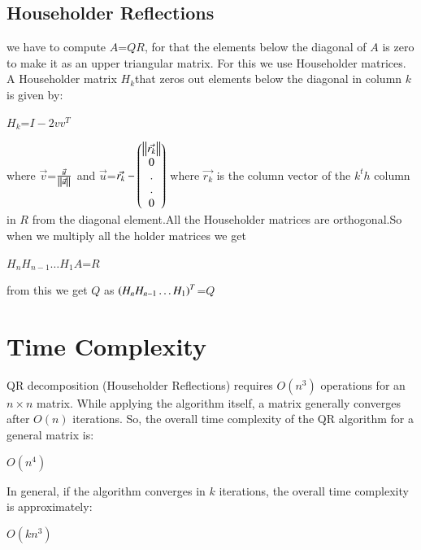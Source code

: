 \documentclass[journal]{IEEEtran}
\begin{document}
\subsection*{Householder Reflections}
we have to compute $A$=$QR$, for that the elements below the diagonal of $A$ is zero to make it as an upper triangular matrix. For this we use Householder matrices.\\
A Householder matrix $H_{k} $that zeros out elements below the diagonal in column $k$ is given by:
\begin{center}
    $H_{k}$=$I-2vv^T$
\end{center}
where $\Vec{v}$=$\frac{\Vec{u}}{\left\vert\left\vert\Vec{u}\right\vert\right\vert}$ and $\Vec{u}$=$\Vec{r_{k}}-\begin{pmatrix}
    \left\vert\left\vert\Vec{r_{k}}\right\vert\right\vert\\0\\.\\.\\0
\end{pmatrix}$ where $\vec{r_{k}}$ is the column vector of the $k^th$ column in $R$ from the diagonal element.All the Householder matrices are orthogonal.So when we multiply all the holder matrices we get 
\begin{center}
    $H_{n}H_{n-1}\dots H_{1}A$=$R$
\end{center}
from this we get $Q$ as $\left(H_{n}H_{n-1}\dots H_{1}\right)^T$=$Q$


\section*{Time Complexity}
QR decomposition (Householder Reflections) requires $O(n^3)$ operations for an $ n \times n $ matrix. While applying the algorithm itself, a matrix generally converges after $ O(n)$ iterations. So, the overall time complexity of the QR algorithm for a general matrix is:
\begin{center}
    $O(n^4)$
\end{center}
In general, if the algorithm converges in $k$ iterations, the overall time complexity is approximately:
\begin{center}
    $O(kn^3)$
\end{center}
\end{document}
